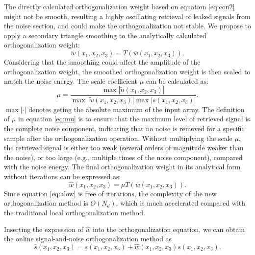 The directly calculated orthogonalization weight based on equation \ref{eq:con2} might not be smooth, resulting a highly oscillating retrieval of leaked signals from the noise section, and could make the orthogonalization not stable. We propose to apply a secondary triangle smoothing to the analytically calculated orthogonalization weight:
\begin{equation}
\label{eq:con4}
\tilde{w}(x_1,x_2,x_3) = T(\overline{w}(x_1,x_2,x_3)).
\end{equation}
Considering that the smoothing could affect the amplitude of the orthogonalization weight, the smoothed orthogonalization weight is then scaled to match the noise energy. The scale coefficient $\mu$ can be calculated as:
\begin{equation}
\label{eq:mu}
\mu = \frac{\max{|\tilde{n}(x_1,x_2,x_3)|}}{\max{|\tilde{w}(x_1,x_2,x_3)|}\max{|s(x_1,x_2,x_3)|}}.
\end{equation}
$\max{|\cdot|}$ denotes geting the absolute maximum of the input array. The definition of $\mu$ in equation \ref{eq:mu} is to ensure that the maximum level of retrieved signal is the complete noise component, indicating that no noise is removed for a specific sample after the orthogonalization operation. Without multiplying the scale $\mu$, the retrieved signal is either too weak (several orders of magnitude weaker than the noise), or too large (e.g., multiple times of the noise component), compared with the noise energy. The final orthogonalization weight in its analytical form without iterations can be expressed as:
\begin{equation}
\label{eq:alow}
\hat{w}(x_1,x_2,x_3) = \mu T(\overline{w}(x_1,x_2,x_3)).
\end{equation}
Since equation \ref{eq:alow} is free of iterations, the complexity of the new orthogonalization method is $O(N_d)$, which is much accelerated compared with the traditional local orthogonalization method. 

Inserting the expression of $\hat{w}$ into the orthogonalization equation, we can obtain the online signal-and-noise orthogonalization method as
\begin{equation}
\label{eq:con3}
\hat{s}(x_1,x_2,x_3) = s(x_1,x_2,x_3)+\hat{w}(x_1,x_2,x_3)s(x_1,x_2,x_3).
\end{equation}

